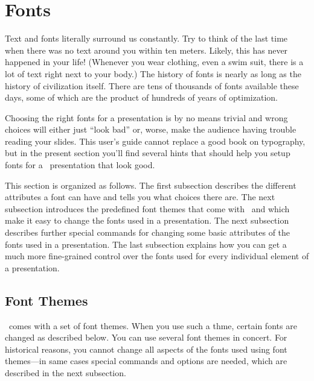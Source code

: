 
%


\section{Fonts}

Text and fonts literally surround us constantly. Try to think of the
last time when  there was no text around you within ten
meters. Likely, this has never happened in your life! 
(Whenever you wear clothing, even a swim suit, there is a lot of text
right next to your body.) The history of fonts is nearly as long as
the history of civilization itself. There are tens of thousands of fonts
available these days, some of which are the product of hundreds of
years of optimization.

Choosing the right fonts for a presentation is by no means
trivial and wrong choices will either just ``look bad'' or, worse,
make the audience having trouble reading your slides.
This user's guide cannot replace a good book on typography, but in the
present section you'll find several hints that should help you setup 
fonts for a \beamer\ presentation that look good.

This section is organized as follows. The first subsection 
describes the different attributes a font can have and tells you what
choices there are. The next subsection introduces the predefined font
themes that come with \beamer\ and which make it easy to change the
fonts used in a presentation. The next subsection describes further
special commands for changing some basic attributes of the fonts used in a
presentation. The last subsection explains how you can get a much more
fine-grained control over the fonts used for every individual element
of a presentation. 





\subsection{Font Themes}

\beamer\ comes with a set of font themes. When you use such a thme,
certain fonts are changed as described below. You can use several font
themes in concert. For historical reasons, you cannot change all
aspects of the fonts used using font themes---in same cases special
commands and options are needed, which are described in the next
subsection.

